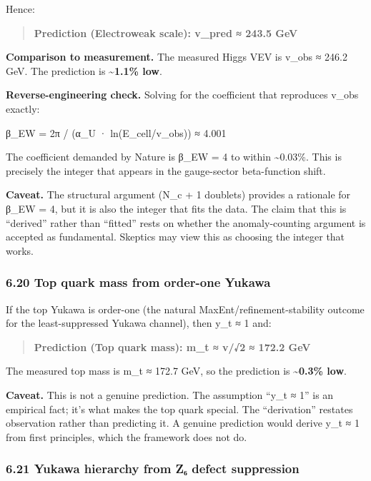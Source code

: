 \documentclass[
]{article}
\begin{document}
Hence:

\begin{quote}
\textbf{Prediction (Electroweak scale): v\_pred ≈ 243.5 GeV}
\end{quote}

\textbf{Comparison to measurement.} The measured Higgs VEV is v\_obs ≈
246.2 GeV. The prediction is \textbf{\textasciitilde1.1\% low}.

\textbf{Reverse-engineering check.} Solving for the coefficient that
reproduces v\_obs exactly:

β\_EW = 2π / (α\_U · ln(E\_cell/v\_obs)) ≈ 4.001

The coefficient demanded by Nature is β\_EW = 4 to within
\textasciitilde0.03\%. This is precisely the integer that appears in the
gauge-sector beta-function shift.

\textbf{Caveat.} The structural argument (N\_c + 1 doublets) provides a
rationale for β\_EW = 4, but it is also the integer that fits the data.
The claim that this is ``derived'' rather than ``fitted'' rests on
whether the anomaly-counting argument is accepted as fundamental.
Skeptics may view this as choosing the integer that works.

\subsubsection{6.20 Top quark mass from order-one
Yukawa}\label{top-quark-mass-from-order-one-yukawa}

If the top Yukawa is order-one (the natural MaxEnt/refinement-stability
outcome for the least-suppressed Yukawa channel), then y\_t ≈ 1 and:

\begin{quote}
\textbf{Prediction (Top quark mass): m\_t ≈ v/√2 ≈ 172.2 GeV}
\end{quote}

The measured top mass is m\_t ≈ 172.7 GeV, so the prediction is
\textbf{\textasciitilde0.3\% low}.

\textbf{Caveat.} This is not a genuine prediction. The assumption ``y\_t
≈ 1'' is an empirical fact; it's what makes the top quark special. The
``derivation'' restates observation rather than predicting it. A genuine
prediction would derive y\_t ≈ 1 from first principles, which the
framework does not do.

\subsubsection{6.21 Yukawa hierarchy from Z₆ defect
suppression}\label{yukawa-hierarchy-from-zux2086-defect-suppression}
\end{document}
